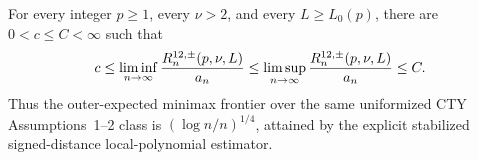 For every integer \(p\geq1\), every \(\nu>2\), and every \(L\geq L_0(p)\), there are \(0<c\leq C<\infty\) such that
\[
 c\leq\liminf_{n\to\infty}{R^{12,\pm}_n(p,\nu,L)\over a_n}
 \leq\limsup_{n\to\infty}{R^{12,\pm}_n(p,\nu,L)\over a_n}\leq C.
\]
Thus the outer-expected minimax frontier over the same uniformized CTY Assumptions~1--2 class is \((\log n/n)^{1/4}\), attained by the explicit stabilized signed-distance local-polynomial estimator.